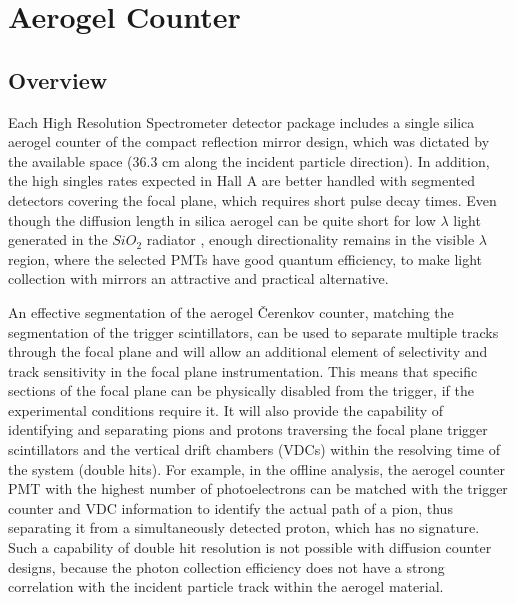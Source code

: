 
\section{Aerogel \Cerenkov Counter}

\subsection{Overview}
Each High Resolution Spectrometer detector package includes a single silica 
aerogel
\Cerenkov counter of the compact reflection mirror design, which was 
dictated by the available space (36.3 cm along the incident particle direction). 
In addition, the high singles
rates expected in Hall A are better handled with segmented detectors
covering the focal plane, which requires short pulse
decay times.
  Even though the diffusion length in
silica aerogel can be quite short for low $\lambda$ light generated in the
$SiO_2$ radiator \cite{Lippert:1993kt}, enough directionality remains in the visible
$\lambda$ region, where the selected PMTs have good quantum efficiency, to make
light collection with mirrors an attractive and practical alternative. 

An effective segmentation of the aerogel \v{C}erenkov counter, matching the 
segmentation of the trigger scintillators, can be used to separate multiple
tracks through the focal plane and will allow an additional element of
selectivity and track sensitivity in the focal plane instrumentation.  This
means that specific sections of the focal plane can be physically disabled from
the trigger, if the experimental conditions require it.  It will also provide
the capability of identifying and separating pions and protons traversing the
focal plane trigger scintillators and the vertical drift chambers (VDCs) within
the resolving time of the system (double hits).  
For example, in the offline
analysis, the aerogel counter PMT with the highest number of photoelectrons can
be matched with the trigger counter and VDC information to identify the actual
path of a pion, thus separating it from a simultaneously detected proton, which
has no \Cerenkov signature.  Such a capability of double hit resolution is
not possible with diffusion \Cerenkov counter designs, because the photon
collection efficiency does not have a strong correlation with the incident
particle track within the aerogel material. 
 
